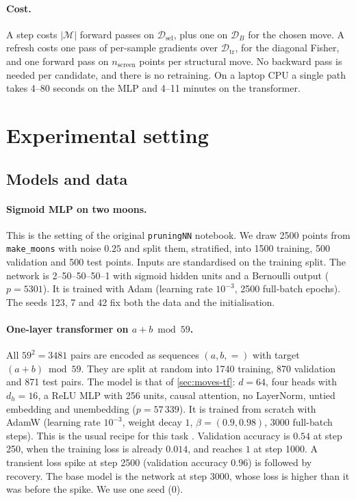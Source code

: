 \documentclass[11pt,a4paper]{article}
\theoremstyle{definition}
\newcommand{\D}{\mathcal{D}}
\newcommand{\Dtr}{\D_{\mathrm{tr}}}
\newcommand{\Dsel}{\D_{\mathrm{sel}}}
\newcommand{\DB}{\D_{B}}
\newcommand{\Mv}{\mathcal{M}}
\newcommand{\code}[1]{\texttt{#1}}
\begin{document}
\paragraph{Cost.} A step costs $|\Mv|$ forward passes on $\Dsel$, plus one on $\DB$ for
the chosen move. A refresh costs one pass of per-sample gradients over $\Dtr$, for the
diagonal Fisher, and one forward pass on $n_{\mathrm{screen}}$ points per structural
move. No backward pass is needed per candidate, and there is no retraining. On a laptop CPU a single path takes 4--80 seconds on the MLP and 4--11 minutes
on the transformer.

\section{Experimental setting}
\label{sec:setup}

\subsection{Models and data}
\label{sec:models}

\paragraph{Sigmoid MLP on two moons.} This is the setting of the original
\code{pruningNN} notebook. We draw 2500 points from \code{make\_moons} with noise
$0.25$ and split them, stratified, into 1500 training, 500 validation and 500 test
points. Inputs are standardised on the training split. The network is 2--50--50--50--1
with sigmoid hidden units and a Bernoulli output ($p=5301$). It is trained with Adam
\citep{kingma2015adam} (learning rate $10^{-3}$, 2500 full-batch epochs). The seeds
123, 7 and 42 fix both the data and the initialisation.

\paragraph{One-layer transformer on $a+b\bmod59$.} All $59^2=3481$ pairs are encoded as
sequences $(a,b,=)$ with target $(a+b)\bmod59$. They are split at random into 1740
training, 870 validation and 871 test pairs. The model is that of \cref{sec:moves-tf}:
$d=64$, four heads with $d_h=16$, a ReLU MLP with 256 units, causal attention, no
LayerNorm, untied embedding and unembedding ($p=57\,339$). It is trained from scratch
with AdamW \citep{loshchilov2019adamw} (learning rate $10^{-3}$, weight decay $1$,
$\beta=(0.9,0.98)$, 3000 full-batch steps). This is the usual recipe for this task
\citep{power2022grokking,nanda2023progress}. Validation accuracy is $0.54$ at step 250,
when the training loss is already $0.014$, and reaches $1$ at step 1000. A transient loss
spike at step 2500 (validation accuracy $0.96$) is followed by recovery. The base model
is the network at step 3000, whose loss is higher than it was before the spike. We use
one seed (0).
\end{document}
